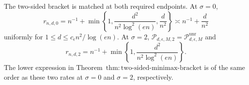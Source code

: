 The two-sided bracket is matched at both required endpoints.  At \(\sigma=0\),
\[
 r_{n,d,0}=n^{-1}+\min\left\{1,\frac{d^2}{n^2\log^2(en)},\frac d{n^2}\right\}
 \asymp n^{-1}+\frac d{n^2}
\]
uniformly for \(1\le d\le c_{\epsilon}n^2/\log(en)\).  At \(\sigma=2\),
\(\mathcal P_{d,\epsilon,M,2}=\mathcal P_{d,\epsilon,M}^{\mathrm{unr}}\) and
\[
 r_{n,d,2}=n^{-1}+\min\left\{1,\frac{d^2}{n^2\log^2(en)}\right\}.
\]
The lower expression in Theorem~\(\mathrm{thm:two\text{-}sided\text{-}minimax\text{-}bracket}\) is of the same order as these two rates at \(\sigma=0\) and \(\sigma=2\), respectively.